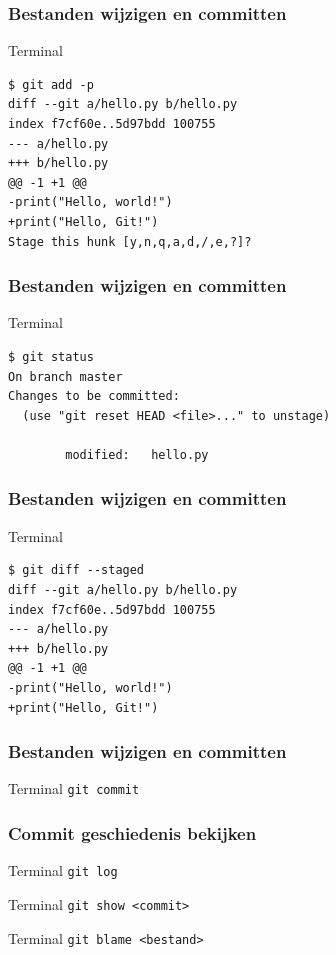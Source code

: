\documentclass[]{beamer}
\begin{document}
\begin{frame}[fragile]
    \frametitle{Bestanden wijzigen en committen}

    \begin{block}{Terminal}
\begin{Verbatim}[fontsize=\scriptsize]
$ git add -p
diff --git a/hello.py b/hello.py
index f7cf60e..5d97bdd 100755
--- a/hello.py
+++ b/hello.py
@@ -1 +1 @@
-print("Hello, world!")
+print("Hello, Git!")
Stage this hunk [y,n,q,a,d,/,e,?]?
\end{Verbatim}
    \end{block}
\end{frame}

\begin{frame}[fragile]
    \frametitle{Bestanden wijzigen en committen}

    \begin{block}{Terminal}
\begin{Verbatim}[fontsize=\scriptsize]
$ git status
On branch master
Changes to be committed:
  (use "git reset HEAD <file>..." to unstage)

        modified:   hello.py
\end{Verbatim}
    \end{block}
\end{frame}

\begin{frame}[fragile]
    \frametitle{Bestanden wijzigen en committen}

    \begin{block}{Terminal}
\begin{Verbatim}[fontsize=\scriptsize]
$ git diff --staged
diff --git a/hello.py b/hello.py
index f7cf60e..5d97bdd 100755
--- a/hello.py
+++ b/hello.py
@@ -1 +1 @@
-print("Hello, world!")
+print("Hello, Git!")
\end{Verbatim}
    \end{block}
\end{frame}

\begin{frame}[fragile]
    \frametitle{Bestanden wijzigen en committen}

    \begin{block}{Terminal}
    \verb/git commit/
    \end{block}
\end{frame}

\begin{frame}[fragile]
    \frametitle{Commit geschiedenis bekijken}

    \begin{block}{Terminal}
    \verb/git log/
    \end{block}

    \pause

    \begin{block}{Terminal}
    \verb/git show <commit>/
    \end{block}

    \pause

    \begin{block}{Terminal}
    \verb/git blame <bestand>/
    \end{block}
\end{frame}
\end{document}
